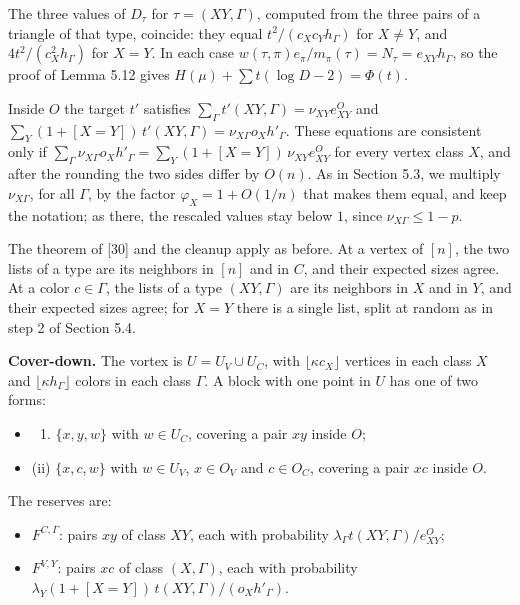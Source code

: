 \documentclass[english,11pt,a4paper]{article}
\providecommand{\tightlist}{\setlength{\itemsep}{0pt}\setlength{\parskip}{0pt}}
\begin{document}
The three values of \(D_\tau\) for \(\tau=(XY,\Gamma)\), computed from the three pairs of a triangle of that type, coincide: they equal \(t^2/(c_Xc_Yh_\Gamma)\) for \(X\ne Y\), and \(4t^2/(c_X^2h_\Gamma)\) for \(X=Y\). In each case \(w(\tau,\pi)e_\pi/m_\pi(\tau)=N_\tau=e_{XY}h_\Gamma\), so the proof of Lemma 5.12 gives \(H(\mu)+\sum t(\log D-2)=\Phi(t)\).

Inside \(O\) the target \(t'\) satisfies \(\sum_\Gamma t'(XY,\Gamma)=\nu_{XY}e^O_{XY}\) and \(\sum_Y(1+[X=Y])\,t'(XY,\Gamma)=\nu_{X\Gamma}o_Xh'_\Gamma\). These equations are consistent only if \(\sum_\Gamma\nu_{X\Gamma}o_Xh'_\Gamma=\sum_Y(1+[X=Y])\,\nu_{XY}e^O_{XY}\) for every vertex class \(X\), and after the rounding the two sides differ by \(O(n)\). As in Section 5.3, we multiply \(\nu_{X\Gamma}\), for all \(\Gamma\), by the factor \(\varphi_X=1+O(1/n)\) that makes them equal, and keep the notation; as there, the rescaled values stay below \(1\), since \(\nu_{X\Gamma}\le1-p\).

The theorem of {[}30{]} and the cleanup apply as before. At a vertex of \([n]\), the two lists of a type are its neighbors in \([n]\) and in \(C\), and their expected sizes agree. At a color \(c\in\Gamma\), the lists of a type \((XY,\Gamma)\) are its neighbors in \(X\) and in \(Y\), and their expected sizes agree; for \(X=Y\) there is a single list, split at random as in step 2 of Section 5.4.

\textbf{Cover-down.} The vortex is \(U=U_V\cup U_C\), with \(\lfloor\kappa c_X\rfloor\) vertices in each class \(X\) and \(\lfloor\kappa h_\Gamma\rfloor\) colors in each class \(\Gamma\). A block with one point in \(U\) has one of two forms:

\begin{itemize}
\tightlist
\item
  \begin{enumerate}
  \def\labelenumi{(\roman{enumi})}
  \tightlist
  \item
    \(\{x,y,w\}\) with \(w\in U_C\), covering a pair \(xy\) inside \(O\);
  \end{enumerate}
\item
  (ii) \(\{x,c,w\}\) with \(w\in U_V\), \(x\in O_V\) and \(c\in O_C\), covering a pair \(xc\) inside \(O\).
\end{itemize}

The reserves are:

\begin{itemize}
\tightlist
\item
  \(F^{C,\Gamma}\): pairs \(xy\) of class \(XY\), each with probability \(\lambda_\Gamma t(XY,\Gamma)/e^O_{XY}\);
\item
  \(F^{V,Y}\): pairs \(xc\) of class \((X,\Gamma)\), each with probability \(\lambda_Y(1+[X=Y])\,t(XY,\Gamma)/(o_Xh'_\Gamma)\).
\end{itemize}
\end{document}
